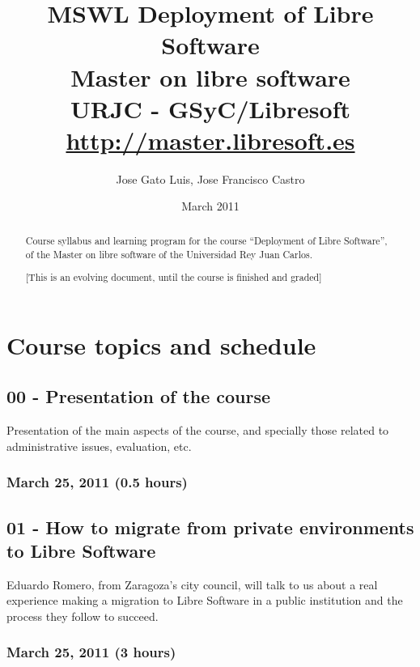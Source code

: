 \documentclass[a4paper]{article}
\title{MSWL Deployment of Libre Software \\
Master on libre software \\
URJC - GSyC/Libresoft \\
\url{http://master.libresoft.es}}
\author{Jose Gato Luis, Jose Francisco Castro}
\date{March 2011}
\begin{document}
\maketitle

\begin{abstract}
Course syllabus and learning program for the course ``Deployment of Libre Software'', of the Master on libre software of the
Universidad Rey Juan Carlos.

[This is an evolving document, until the course is finished and graded]
\end{abstract}

\tableofcontents

\section{Course topics and schedule}

\subsection{00 - Presentation of the course}

Presentation of the main aspects of the course, and specially those
related to administrative issues, evaluation, etc.

\subsubsection{March 25, 2011 (0.5 hours)}

\subsection{01 - How to migrate from private environments to Libre Software}

Eduardo Romero, from Zaragoza's city council, will talk to us about a real experience making a migration to Libre Software in a public institution and the process they follow to succeed. 

\subsubsection{March 25, 2011 (3 hours)}
\end{document}

